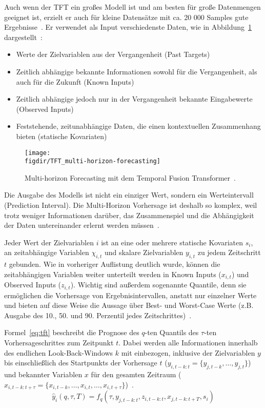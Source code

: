 Auch wenn der \ac{TFT} ein großes Modell ist und am besten für große Datenmengen geeignet ist, erzielt er auch für kleine Datensätze mit ca. 20 000 Samples gute Ergebnisse~\cite{Beitner.2020}.
Er verwendet als Input verschiedenste Daten, wie in Abbildung~\ref{FIG:tft-forecasting} dargestellt~\cite{Lim.19.12.2019}:
\begin{itemize}
 \item Werte der Zielvariablen aus der Vergangenheit (Past Targets)
 \item Zeitlich abhängige bekannte Informationen sowohl für die Vergangenheit, als auch für die Zukunft (Known Inputs)
 \item Zeitlich abhängige jedoch nur in der Vergangenheit bekannte Eingabewerte (Observed Inputs)
 \item Feststehende, zeitunabhängige Daten, die einen kontextuellen Zusammenhang bieten (statische Kovariaten)
\end{itemize}
\begin{figure}
 \caption[Multi-horizon Forecasting mit dem Temporal Fusion Transformer]{Multi-horizon Forecasting mit dem Temporal Fusion Transformer~\cite{Lim.19.12.2019}.}
 {\texttt{[image: \\figdir/TFT\_multi-horizon-forecasting]}}
 \label{FIG:tft-forecasting}
\end{figure}
Die Ausgabe des Modells ist nicht ein einziger Wert, sondern ein Werteintervall (Prediction Interval).
Die Multi-Horizon Vorhersage ist deshalb so komplex, weil trotz weniger Informationen darüber, das Zusammenspiel und die Abhängigkeit der Daten untereinander erlernt werden müssen~\cite{Lim.19.12.2019}.

Jeder Wert der Zielvariablen $i$ ist an eine oder mehrere statische Kovariaten $s_i$, an zeitabhängige Variablen $\chi_{i,t}$ und skalare Zielvariablen $y_{i,t}$ zu jedem Zeitschritt $t$ gebunden.
Wie in vorheriger Auflistung deutlich wurde, können die zeitabhängigen Variablen weiter unterteilt werden in Known Inputs ($x_{i,t}$) und Observed Inputs ($z_{i,t}$).
Wichtig sind außerdem sogenannte Quantile, denn sie ermöglichen die Vorhersage von Ergebnisintervallen, anstatt nur einzelner Werte und bieten auf diese Weise die Aussage über Best- und Worst-Case Werte (z.B. Ausgabe des 10., 50. und 90. Perzentil jedes Zeitschrittes)~\cite{Lim.19.12.2019}.

Formel~\ref{eq:tft} beschreibt die Prognose des $q$-ten Quantils des $\tau$-ten Vorhersageschrittes zum Zeitpunkt $t$.
Dabei werden alle Informationen innerhalb des endlichen Look-Back-Windows $k$ mit einbezogen, inklusive der Zielvariablen $y$ bis einschließlich des Startpunkts der Vorhersage $t$ ($y_{i,t-k:t} = \{y_{j,t-k}, \ldots, y_{j,t}\}$) und bekannter Variablen $x$ für den gesamten Zeitraum ($x_{i,t-k:t+\tau} = \{x_{i,t-k}, \ldots, x_{i,t}, \ldots, x_{i,t+\tau}\}$)~\cite{Lim.19.12.2019}.
\begin{equation}
 \label{eq:tft}
 \hat{y}_i(q, \tau, T) = f_q(\tau, y_{j,t-k:t}, z_{i,t-k:t}, x_{j,t-k:t+T}, s_i)
\end{equation}

